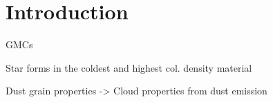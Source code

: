 \chapter{Introduction}

GMCs

Star forms in the coldest and highest col. density material

Dust grain properties -> Cloud properties from dust emission
